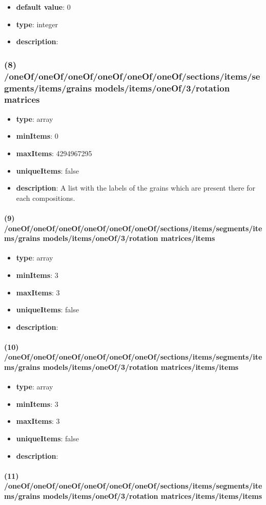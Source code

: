 \begin{itemize}[leftmargin=9em]\item {\bf default value}: 0
\item {\bf type}: integer
\item {\bf description}: 
\end{itemize}\subsubsection{(8) /oneOf/oneOf/oneOf/oneOf/oneOf/oneOf/sections/items/segments/items/grains models/items/oneOf/3/rotation matrices}
\begin{itemize}[leftmargin=8em]\item {\bf type}: array
\item {\bf minItems}: 0
\item {\bf maxItems}: 4294967295
\item {\bf uniqueItems}: false
\item {\bf description}: A list with the labels of the grains which are present there for each compositions.
\end{itemize}\paragraph{(9) /oneOf/oneOf/oneOf/oneOf/oneOf/oneOf/sections/items/segments/items/grains models/items/oneOf/3/rotation matrices/items}
\begin{itemize}[leftmargin=9em]\item {\bf type}: array
\item {\bf minItems}: 3
\item {\bf maxItems}: 3
\item {\bf uniqueItems}: false
\item {\bf description}: 
\end{itemize}\paragraph{(10) /oneOf/oneOf/oneOf/oneOf/oneOf/oneOf/sections/items/segments/items/grains models/items/oneOf/3/rotation matrices/items/items}
\begin{itemize}[leftmargin=10em]\item {\bf type}: array
\item {\bf minItems}: 3
\item {\bf maxItems}: 3
\item {\bf uniqueItems}: false
\item {\bf description}: 
\end{itemize}\paragraph{(11) /oneOf/oneOf/oneOf/oneOf/oneOf/oneOf/sections/items/segments/items/grains models/items/oneOf/3/rotation matrices/items/items/items}
